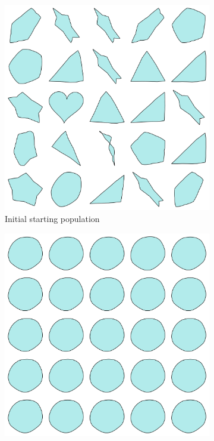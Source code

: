 \documentclass{article}
\begin{document}
\begin{figure}[H]
    \centering
    \begin{subfigure}[b]{0.32\textwidth}
        \centering
        \includegraphics[width=\textwidth]{figures/GAResults/GA15/50initial_pop.png}
        \caption{Initial starting population}
        \label{fig:GA15_starting}
    \end{subfigure}
    \hfill
    \begin{subfigure}[b]{0.32\textwidth}
        \centering
        \includegraphics[width=\textwidth]{figures/GAResults/GA15/latent/final_generation.png}

\end{subfigure}
\end{figure}
\end{document}
